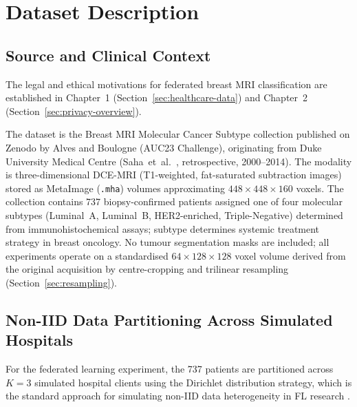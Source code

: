 \section{Dataset Description}
\label{sec:dataset}


\subsection{Source and Clinical Context}
\label{sec:dataset-description}

The legal and ethical motivations for federated breast MRI classification are
established in Chapter~1 (Section~\ref{sec:healthcare-data}) and Chapter~2
(Section~\ref{sec:privacy-overview}).

The dataset is the Breast MRI Molecular Cancer Subtype collection published on
Zenodo by Alves and Boulogne \cite{alves2023breastmri} (AUC23 Challenge),
originating from Duke University Medical Centre (Saha~et~al.\ \cite{saha2018},
retrospective, 2000--2014).
The modality is three-dimensional DCE-MRI (T1-weighted, fat-saturated subtraction
images) stored as MetaImage (\texttt{.mha}) volumes approximating
$448 \times 448 \times 160$ voxels.
The collection contains 737 biopsy-confirmed patients assigned one of four
molecular subtypes (Luminal~A, Luminal~B, HER2-enriched, Triple-Negative)
determined from immunohistochemical assays; subtype determines systemic treatment
strategy in breast oncology.
No tumour segmentation masks are included; all experiments operate on a
standardised $64 \times 128 \times 128$ voxel volume derived from the original
acquisition by centre-cropping and trilinear resampling
(Section~\ref{sec:resampling}).


\subsection{Non-IID Data Partitioning Across Simulated Hospitals}
\label{sec:noniid-partition}

For the federated learning experiment, the 737 patients are
partitioned across $K=3$ simulated hospital clients using
the Dirichlet distribution strategy, which is the standard
approach for simulating non-IID data heterogeneity in FL
research \cite{kairouz2021advances}.

